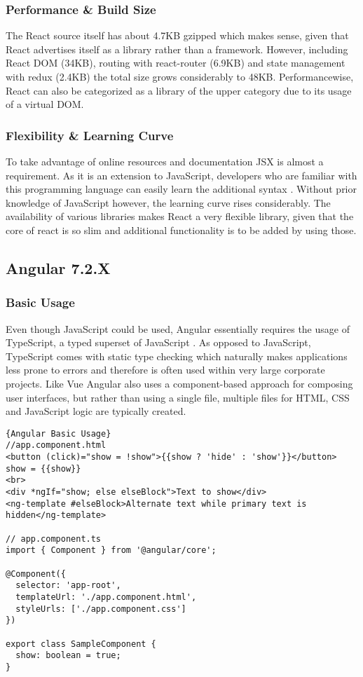 \subsubsection{Performance \& Build Size}
The React source itself has about 4.7KB gzipped which makes sense, given that React advertises itself as a library rather than a framework. However, including React DOM (34KB), routing with react-router (6.9KB) and state management with redux (2.4KB) the total size grows considerably to 48KB. Performancewise, React can also be categorized as a library of the upper category \cite{FrameworksPerformance:online} due to its usage of a virtual DOM.

\subsubsection{Flexibility \& Learning Curve}
To take advantage of online resources and documentation JSX is almost a requirement. As it is an extension to JavaScript, developers who are familiar with this programming language can easily learn the additional syntax \cite{ReactJSX:online}. Without prior knowledge of JavaScript however, the learning curve rises considerably. The availability of various libraries makes React a very flexible library, given that the core of react is so slim and additional functionality is to be added by using those. 

\subsection{Angular 7.2.X}

\subsubsection{Basic Usage}
Even though JavaScript could be used, Angular essentially requires the usage of TypeScript, a typed superset of JavaScript \cite{TypeScript:online}. As opposed to JavaScript, TypeScript comes with static type checking which naturally makes applications less prone to errors \cite{DynamicallyTypedLanguages:proceedings} and therefore is often used within very large corporate projects. Like Vue Angular also uses a component-based approach for composing user interfaces, but rather than using a single file, multiple files for HTML, CSS and JavaScript logic are typically created.

\begin{lstlisting}[caption=Angular Basic Usage Example, captionpos=b, style=htmlcssjs]{Angular Basic Usage}
//app.component.html
<button (click)="show = !show">{{show ? 'hide' : 'show'}}</button> show = {{show}}
<br>
<div *ngIf="show; else elseBlock">Text to show</div>
<ng-template #elseBlock>Alternate text while primary text is hidden</ng-template>

// app.component.ts
import { Component } from '@angular/core';

@Component({
  selector: 'app-root',
  templateUrl: './app.component.html',
  styleUrls: ['./app.component.css']
})

export class SampleComponent {
  show: boolean = true;
}
\end{lstlisting}

